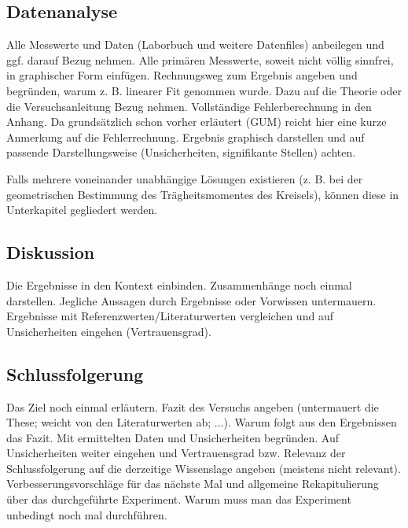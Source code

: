 \subsection{Datenanalyse}

Alle Messwerte und Daten (Laborbuch und weitere Datenfiles) anbeilegen und ggf. darauf Bezug nehmen.
Alle primären Messwerte, soweit nicht völlig sinnfrei, in graphischer Form einfügen.
Rechnungsweg zum Ergebnis angeben und begründen, warum z. B. linearer Fit genommen wurde.
Dazu auf die Theorie oder die Versuchsanleitung Bezug nehmen.
Vollständige Fehlerberechnung in den Anhang.
Da grundsätzlich schon vorher erläutert (GUM) reicht hier eine kurze Anmerkung auf die Fehlerrechnung.
Ergebnis graphisch darstellen und auf passende Darstellungsweise (Unsicherheiten, signifikante Stellen) achten.

Falls mehrere voneinander unabhängige Lösungen existieren (z. B. bei der geometrischen Bestimmung des Trägheitsmomentes des Kreisels), können diese in Unterkapitel gegliedert werden.

\subsection{Diskussion}

Die Ergebnisse in den Kontext einbinden.
Zusammenhänge noch einmal darstellen.
Jegliche Aussagen durch Ergebnisse oder Vorwissen untermauern.
Ergebnisse mit Referenzwerten/Literaturwerten vergleichen und auf Unsicherheiten eingehen (Vertrauensgrad).

\subsection{Schlussfolgerung}

Das Ziel noch einmal erläutern.
Fazit des Versuchs angeben (untermauert die These; weicht von den Literaturwerten ab; ...).
Warum folgt aus den Ergebnissen das Fazit.
Mit ermittelten Daten und Unsicherheiten begründen.
Auf Unsicherheiten weiter eingehen und Vertrauensgrad bzw. Relevanz der Schlussfolgerung auf die derzeitige Wissenslage angeben (meistens nicht relevant).
Verbesserungsvorschläge für das nächste Mal und allgemeine Rekapitulierung über das durchgeführte Experiment.
Warum muss man das Experiment unbedingt noch mal durchführen.
